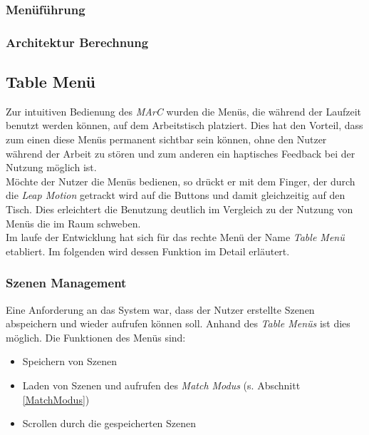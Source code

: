 \subsubsection{Menüführung}
\subsubsection{Architektur Berechnung}


\subsection{Table Menü}\label{sec:TableMenü}

Zur intuitiven Bedienung des \textit{MArC} wurden die Menüs, die während der Laufzeit benutzt werden können, auf dem Arbeitstisch platziert. Dies hat den Vorteil, dass zum einen diese Menüs permanent sichtbar sein können, ohne den Nutzer während der Arbeit zu stören und zum anderen ein haptisches Feedback bei der Nutzung möglich ist.\\
Möchte der Nutzer die Menüs bedienen, so drückt er mit dem Finger, der durch die \textit{Leap Motion} getrackt wird auf die Buttons und damit gleichzeitig auf den Tisch. Dies erleichtert die Benutzung deutlich im Vergleich zu der Nutzung von Menüs die im Raum schweben.\\
Im laufe der Entwicklung hat sich für das rechte Menü der Name \textit{Table Menü} etabliert. Im folgenden wird dessen Funktion im Detail erläutert.

\subsubsection{Szenen Management}
Eine Anforderung an das System war, dass der Nutzer erstellte Szenen abspeichern und wieder aufrufen können soll. Anhand des \textit{Table Menüs} ist dies möglich. Die Funktionen des Menüs sind:
\begin{itemize}
	\item Speichern von Szenen
	\item Laden von Szenen und aufrufen des \textit{Match Modus} (s. Abschnitt \ref{MatchModus})
	\item Scrollen durch die gespeicherten Szenen

\end{itemize}



